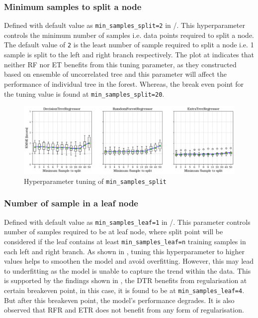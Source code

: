 \subsubsection*{Minimum samples to split a node}\label{sec:min_samples_split}

Defined with default value as {\tt min\_samples\_split=2} in \scikit/. This hyperparameter controls the minimum number of samples i.e. data points required to split a node. The default value of {\tt 2} is the least number of sample required to split a node i.e. 1 sample is split to the left and right branch respectively. The plot at  indicates that neither RF nor ET benefits from this tuning parameter, as they constructed based on ensemble of uncorrelated tree and this parameter will affect the performance of individual tree in the forest. Whereas, the break even point for the tuning value is found at {\tt min\_samples\_split=20}.  
\begin{figure}[h]
    \centering
        \includegraphics[width=.85\textwidth]{02_figures/hpo_min_samples_split.png}
        \caption{Hyperparameter tuning of {\tt min\_samples\_split}}
        \label{fig:hpo_min_samples_split}
\end{figure}


\subsubsection*{Number of sample in a leaf node}\label{sec:min_samples_leaf}

Defined with default value as {\tt min\_samples\_leaf=1} in \scikit/. This parameter controls number of samples required to be at leaf node, where split point will be considered if the leaf contains at least {\tt min\_samples\_leaf=n} training samples in each left and right branch. As shown in , tuning this hyperparameter to higher values helps to smoothen the model and avoid overfitting. However, this may lead to underfitting as the model is unable to capture the trend within the data. This is supported by the findings shown in , the DTR benefits from regularisation at certain breakeven point, in this case, it is found to be at {\tt min\_samples\_leaf=4}. But after this breakeven point, the model's performance degrades. It is also observed that RFR and ETR does not benefit from any form of regularisation.  

